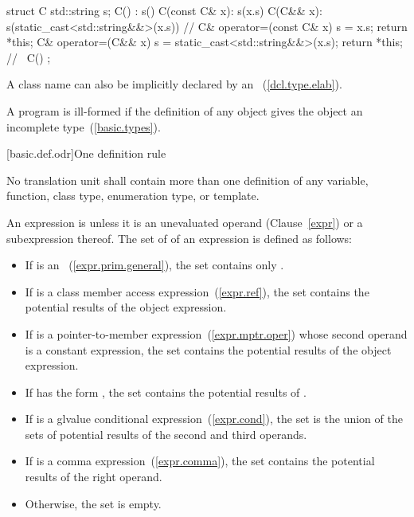 \begin{codeblock}
struct C {
  std::string s;
  C() : s() { }
  C(const C& x): s(x.s) { }
  C(C&& x): s(static_cast<std::string&&>(x.s)) { }
    // 
  C& operator=(const C& x) { s = x.s; return *this; }
  C& operator=(C&& x) { s = static_cast<std::string&&>(x.s); return *this; }
    // 
  ~C() { }
};
\end{codeblock}
\exitexample

\pnum
\enternote A class name can also be implicitly declared by an
~(\ref{dcl.type.elab}).
\exitnote

\pnum
{}%
A program is ill-formed if the definition of any object gives the object
an incomplete type~(\ref{basic.types}).

%
%
%
%
%
[basic.def.odr]{One definition rule}

\pnum
No translation unit shall contain more than one definition of any
variable, function, class type, enumeration type, or template.

\pnum
An expression is  unless it is an
unevaluated operand (Clause~\ref{expr}) or a subexpression thereof.
The set of  of an expression  is
defined as follows:

\begin{itemize}
\item If  is an
~(\ref{expr.prim.general}), the set
contains only .
\item If  is a class member access
expression~(\ref{expr.ref}), the set contains the potential results of
the object expression.
\item If  is a pointer-to-member
expression~(\ref{expr.mptr.oper}) whose second operand is a constant
expression, the set contains the potential results of the object
expression.
\item If  has the form , the set contains the
potential results of .
\item If  is a glvalue conditional
expression~(\ref{expr.cond}), the set is the union of the sets of
potential results of the second and third operands.
\item If  is a comma expression~(\ref{expr.comma}), the set
contains the potential results of the right operand.
\item Otherwise, the set is empty.
\end{itemize}

